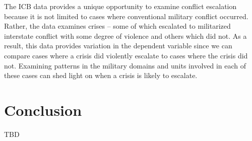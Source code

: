 \documentclass[12pt,letterpaper]{article}
\begin{document}
	The ICB data provides a unique opportunity to examine conflict escalation because it is not limited to cases where conventional military conflict occurred. Rather, the data examines crises -- some of which escalated to militarized interstate conflict with some degree of violence and others which did not. As a result, this data provides variation in the dependent variable since we can compare cases where a crisis did violently escalate to cases where the crisis did not. Examining patterns in the military domains and units involved in each of these cases can shed light on when a crisis is likely to escalate.

\section{Conclusion}
	TBD

\singlespacing


	
\end{document}
